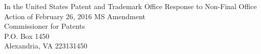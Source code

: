 \documentclass[11pt,letterpaper,oneside]{article}
\newcommand{\NotificationDate}{February 26, 2016}
\begin{document}
\Title
        {In the United States Patent and Trademark Office}
        {Response to Non-Final Office Action of \NotificationDate{}}
        {\noindent{}MS Amendment\\
        Commissioner for Patents\\
        P.O. Box 1450\\
        Alexandria, VA 22313\textemdash{}1450\\}


\Intro

\end{document}
